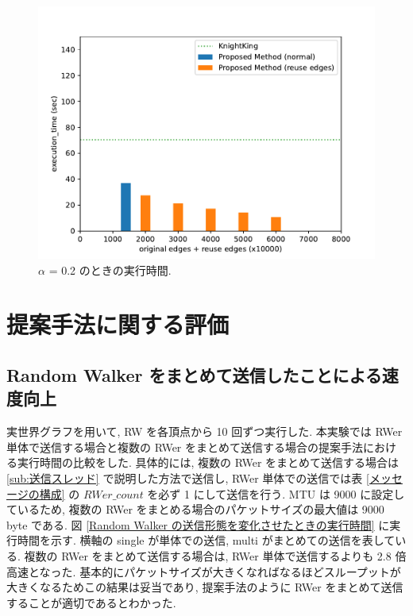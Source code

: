 \begin{figure}[t!]
    \centering
    \includegraphics[scale=0.8]{figure/AR_cache_alpha_0.2.pdf}
    \caption{$\alpha$ = 0.2 のときの実行時間.}
    \label{alpha = 0.2 のときの実行時間}
\end{figure}

\section{提案手法に関する評価}

\subsection{Random Walker をまとめて送信したことによる速度向上}\label{Random Walker をまとめて送信した場合とそうでない場合の実行時間}

実世界グラフを用いて, RW を各頂点から 10 回ずつ実行した. 本実験では RWer 単体で送信する場合と複数の RWer をまとめて送信する場合の提案手法における実行時間の比較をした. 具体的には, 複数の RWer をまとめて送信する場合は \ref{sub:送信スレッド} で説明した方法で送信し, RWer 単体での送信では表 \ref{メッセージの構成} の $RWer\_count$ を必ず 1 にして送信を行う. MTU は 9000 に設定しているため, 複数の RWer をまとめる場合のパケットサイズの最大値は 9000 byte である. 
図 \ref{Random Walker の送信形態を変化させたときの実行時間} に実行時間を示す. 横軸の single が単体での送信, multi がまとめての送信を表している. 複数の RWer をまとめて送信する場合は, RWer 単体で送信するよりも 2.8 倍高速となった. 基本的にパケットサイズが大きくなればなるほどスループットが大きくなるためこの結果は妥当であり, 提案手法のように RWer をまとめて送信することが適切であるとわかった. 

